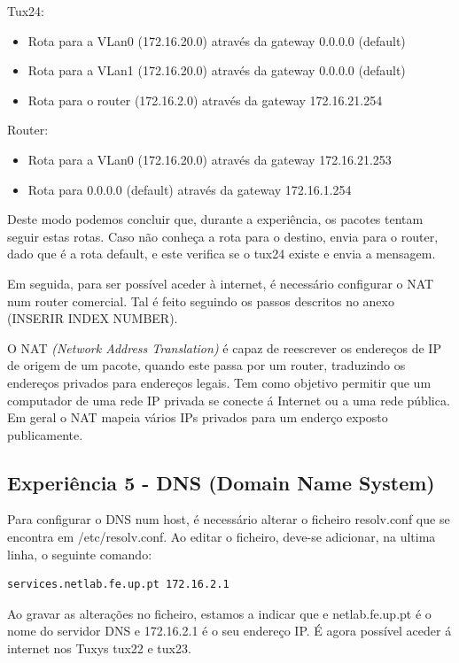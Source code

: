 \documentclass[11pt]{article}
\begin{document}
Tux24:
\begin{itemize}
\item Rota para a VLan0 (172.16.20.0) através da gateway 0.0.0.0 (default)
\item Rota para a VLan1 (172.16.20.0) através da gateway 0.0.0.0 (default)
\item Rota para o router (172.16.2.0) através da gateway 172.16.21.254
\end{itemize}

Router:
\begin{itemize}
\item Rota para a VLan0 (172.16.20.0) através da gateway 172.16.21.253
\item Rota para 0.0.0.0 (default) através da gateway 172.16.1.254
\end{itemize}

Deste modo podemos concluir que, durante a experiência, os pacotes tentam seguir estas rotas. Caso não conheça a rota para o destino, envia para o router, dado que é a rota default, e este verifica se o tux24 existe e envia a mensagem. 

Em seguida, para ser possível aceder à internet, é necessário configurar o NAT num router comercial. Tal é feito seguindo os passos descritos no anexo (INSERIR INDEX NUMBER).

O NAT \emph{(Network Address Translation)} é capaz de reescrever os endereços de IP de origem de um pacote, quando este passa por um router, traduzindo os endereços privados para endereços legais. Tem como objetivo permitir que um computador de uma rede IP privada se conecte á Internet ou a uma rede pública. Em geral o NAT mapeia vários IPs privados para um enderço exposto publicamente.

\subsection{Experiência 5 - DNS (Domain Name System)}

Para configurar o DNS num host, é necessário alterar o ficheiro resolv.conf que se encontra em /etc/resolv.conf. Ao editar o ficheiro, deve-se adicionar, na ultima linha, o seguinte comando:

\begin{lstlisting}[language=bash]
    services.netlab.fe.up.pt 172.16.2.1
\end{lstlisting}

Ao gravar as alterações no ficheiro, estamos a indicar que e netlab.fe.up.pt é o nome do servidor DNS e 172.16.2.1 é o seu endereço IP. É agora possível aceder á internet nos Tuxys tux22 e tux23.
\end{document}
